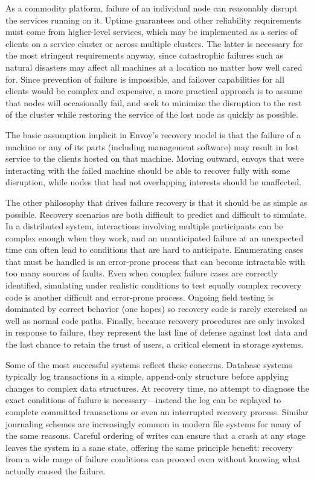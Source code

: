 As a commodity platform, failure of an individual node can reasonably disrupt the services running on it. Uptime guarantees and other reliability requirements must come from higher-level services, which may be implemented as a series of clients on a service cluster or across multiple clusters. The latter is necessary for the most stringent requirements anyway, since catastrophic failures such as natural disasters may affect all machines at a location no matter how well cared for. Since prevention of failure is impossible, and failover capabilities for all clients would be complex and expensive, a more practical approach is to assume that nodes will occasionally fail, and seek to minimize the disruption to the rest of the cluster while restoring the service of the lost node as quickly as possible.

The basic assumption implicit in Envoy's recovery model is that the failure of a machine or any of its parts (including management software) may result in lost service to the clients hosted on that machine. Moving outward, envoys that were interacting with the failed machine should be able to recover fully with some disruption, while nodes that had not overlapping interests should be unaffected.

The other philosophy that drives failure recovery is that it should be as simple as possible. Recovery scenarios are both difficult to predict and difficult to simulate. In a distributed system, interactions involving multiple participants can be complex enough when they work, and an unanticipated failure at an unexpected time can often lead to conditions that are hard to anticipate. Enumerating cases that must be handled is an error-prone process that can become intractable with too many sources of faults. Even when complex failure cases are correctly identified, simulating under realistic conditions to test equally complex recovery code is another difficult and error-prone process. Ongoing field testing is dominated by correct behavior (one hopes) so recovery code is rarely exercised as well as normal code paths. Finally, because recovery procedures are only invoked in response to failure, they represent the last line of defense against lost data and the last chance to retain the trust of users, a critical element in storage systems.

Some of the most successful systems reflect these concerns. Database systems typically log transactions in a simple, append-only structure before applying changes to complex data structures. At recovery time, no attempt to diagnose the exact conditions of failure is necessary---instead the log can be replayed to complete committed transactions or even an interrupted recovery process. Similar journaling schemes are increasingly common in modern file systems for many of the same reasons. Careful ordering of writes can ensure that a crash at any stage leaves the system in a sane state, offering the same principle benefit: recovery from a wide range of failure conditions can proceed even without knowing what actually caused the failure.

